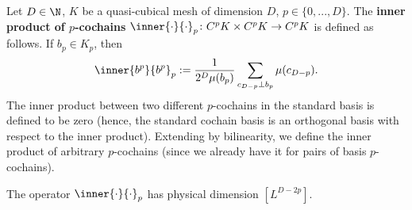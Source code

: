 \begin{definition}
  Let
    $D \in \N$,
    $K$ be a quasi-cubical mesh of dimension $D$,
    $p \in \{0, ..., D\}$.
  The \textbf{inner product of $p$-cochains}
  $\inner{\cdot}{\cdot}_p \colon C^p K \times C^p K \to C^p K$
  is defined as follows.
  If $b_p \in K_p$, then
  \begin{equation}
    \inner{b^p}{b^p}_p :=
    \frac{1}{2^D \mu(b_p)} \sum_{c_{D - p} \perp b_p} \mu(c_{D - p}).
  \end{equation}
  The inner product between two different $p$-cochains in the standard basis is
  defined to be zero
  (hence, the standard cochain basis is an orthogonal basis with respect to the
  inner product).
  Extending by bilinearity, we define the inner product of arbitrary
  $p$-cochains (since we already have it for pairs of basis $p$-cochains).

  The operator $\inner{\cdot}{\cdot}_p$ has physical dimension $[L^{D - 2 p}]$.
\end{definition}

